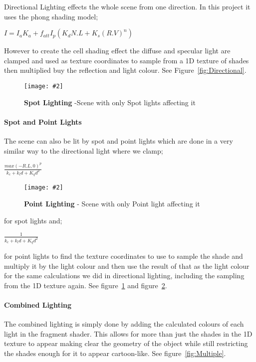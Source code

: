 \documentclass[10pt, a4paper]{article}
\newcommand{\figuremacro}[5]{
    \begin{figure}[#1]
        \centering
        \texttt{[image: \#2]}
        \caption[#3]{\textbf{#3}#4}
        \label{fig:#2}
    \end{figure}
}
\begin{document}
	 Directional Lighting effects the whole scene from one direction. In this project it uses the phong shading model;
	 
	 {\centering \(
	 	I = I_{a} K_{a}+f_{att}I_{p}(K_{d}N.L+K_{s}(R.V)^n)
	 	\)\par}
	 
	 However to create the cell shading effect the diffuse and specular light are clamped and used as texture coordinates to sample from a 1D texture of shades then multiplied buy the reflection and light colour. See Figure~\ref{fig:Directional}.
	 
	 \figuremacro{h}{Spot}{Spot Lighting}{ -Scene with only Spot lights affecting it}{1.0}
	 
	 \paragraph{Spot and Point Lights}
	 
	 The scene can also be lit by spot and point lights which are done in a very similar way to the directional light where we clamp;
	 
	  {\centering \Large\(
	  	\frac{max(-R.L,0)^p}{k_{c}+k_{l}d+K_{q}d^2}
	  	\)\par}
	  
	  \figuremacro{h}{Point}{Point Lighting}{ - Scene with only Point light affecting it}{1.0}
	  
	  for spot lights and;
	  
	  	  {\centering \Large\(
	  	  	\frac{1}{k_{c}+k_{l}d+K_{q}d^2}
	  	  	\)\par}
	  for point lights to find the texture coordinates to use to sample the shade and multiply it by the light colour and then use the result of that as the light colour for the same calculations we did in directional lighting, including the sampling from the 1D texture again. See figure~\ref{fig:Spot} and figure~\ref{fig:Point}.
	  
	  \paragraph{Combined Lighting}
	  
	  The combined lighting is simply done by adding the calculated colours of each light in the fragment shader. This allows for more than just the shades in the 1D texture to appear making clear the geometry of the object while still restricting the shades enough for it to appear cartoon-like. See figure~\ref{fig:Multiple}.
	 
\end{document}
